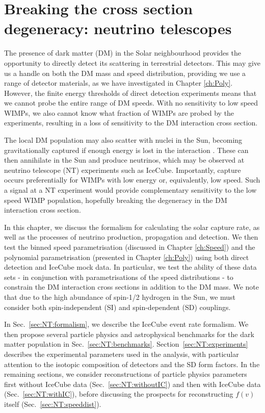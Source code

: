 \chapter[Neutrino telescopes]{Breaking the cross section degeneracy: neutrino telescopes}
\label{ch:NT}

The presence of dark matter (DM) in the Solar neighbourhood provides the opportunity to directly detect its scattering in terrestrial detectors. This may give us a handle on both the DM mass and speed distribution, providing we use a range of detector materials, as we have investigated in Chapter \ref{ch:Poly}. However, the finite energy thresholds of direct detection experiments means that we cannot probe the entire range of DM speeds. With no sensitivity to low speed WIMPs, we also cannot know what fraction of WIMPs are probed by the experiments, resulting in a loss of sensitivity to the DM interaction cross section.

The local DM population may also scatter with nuclei in the Sun, becoming gravitationally captured if enough energy is lost in the interaction \cite{Press:1985,Silk:1985, Gaisser:1986, Srednicki:1987, Griest:1987}. These can then annihilate in the Sun and produce neutrinos, which may be observed at neutrino telescope (NT) experiments such as IceCube. Importantly, capture occurs preferentially for WIMPs with low energy or, equivalently, low speed. Such a signal at a NT experiment would provide complementary sensitivity to the low speed WIMP population, hopefully breaking the degeneracy in the DM interaction cross section. 

In this chapter, we discuss the formalism for calculating the solar capture rate, as well as the processes of neutrino production, propagation and detection. We then test the binned speed parametrisation (discussed in Chapter \ref{ch:Speed}) and the polynomial parametrisation (presented in Chapter \ref{ch:Poly}) using both direct detection and IceCube mock data. In particular, we test the ability of these data sets - in conjunction with parametrisations of the speed distributions - to constrain the DM interaction cross sections in addition to the DM mass. We note that due to the high abundance of spin-1/2 hydrogen in the Sun, we must consider both spin-independent (SI) and spin-dependent (SD) couplings.

In Sec.~\ref{sec:NT:formalism}, we describe the IceCube event rate formalism. We then propose several particle physics and astrophysical benchmarks for the dark matter population in Sec.~\ref{sec:NT:benchmarks}. Section~\ref{sec:NT:experiments} describes the experimental parameters used in the analysis, with particular attention to the isotopic composition of detectors and the SD form factors. In the remaining sections, we consider reconstructions of particle physics parameters first without IceCube data (Sec.~\ref{sec:NT:withoutIC}) and then with IceCube data (Sec.~\ref{sec:NT:withIC}), before discussing the prospects for reconstructing $f(v)$ itself (Sec.~\ref{sec:NT:speeddist}).

